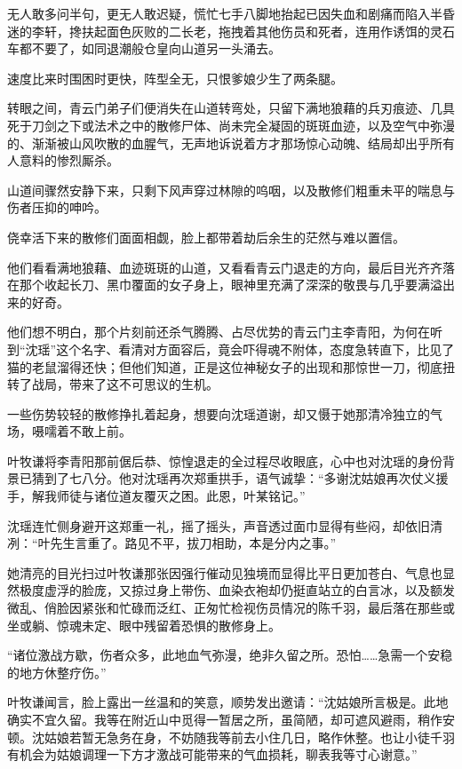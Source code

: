 无人敢多问半句，更无人敢迟疑，慌忙七手八脚地抬起已因失血和剧痛而陷入半昏迷的李轩，搀扶起面色灰败的二长老，拖拽着其他伤员和死者，连用作诱饵的灵石车都不要了，如同退潮般仓皇向山道另一头涌去。

速度比来时围困时更快，阵型全无，只恨爹娘少生了两条腿。

\vspace{2em}

转眼之间，青云门弟子们便消失在山道转弯处，只留下满地狼藉的兵刃痕迹、几具死于刀剑之下或法术之中的散修尸体、尚未完全凝固的斑斑血迹，以及空气中弥漫的、渐渐被山风吹散的血腥气，无声地诉说着方才那场惊心动魄、结局却出乎所有人意料的惨烈厮杀。

山道间骤然安静下来，只剩下风声穿过林隙的呜咽，以及散修们粗重未平的喘息与伤者压抑的呻吟。

侥幸活下来的散修们面面相觑，脸上都带着劫后余生的茫然与难以置信。

他们看看满地狼藉、血迹斑斑的山道，又看看青云门退走的方向，最后目光齐齐落在那个收起长刀、黑巾覆面的女子身上，眼神里充满了深深的敬畏与几乎要满溢出来的好奇。

他们想不明白，那个片刻前还杀气腾腾、占尽优势的青云门主李青阳，为何在听到“沈瑶”这个名字、看清对方面容后，竟会吓得魂不附体，态度急转直下，比见了猫的老鼠溜得还快；但他们知道，正是这位神秘女子的出现和那惊世一刀，彻底扭转了战局，带来了这不可思议的生机。

一些伤势较轻的散修挣扎着起身，想要向沈瑶道谢，却又慑于她那清冷独立的气场，嗫嚅着不敢上前。

叶牧谦将李青阳那前倨后恭、惊惶退走的全过程尽收眼底，心中也对沈瑶的身份背景已猜到了七八分。他对沈瑶再次郑重拱手，语气诚挚：“多谢沈姑娘再次仗义援手，解我师徒与诸位道友覆灭之困。此恩，叶某铭记。”

沈瑶连忙侧身避开这郑重一礼，摇了摇头，声音透过面巾显得有些闷，却依旧清冽：“叶先生言重了。路见不平，拔刀相助，本是分内之事。”

她清亮的目光扫过叶牧谦那张因强行催动见独境而显得比平日更加苍白、气息也显然极度虚浮的脸庞，又掠过身上带伤、血染衣袍却仍挺直站立的白言冰，以及额发微乱、俏脸因紧张和忙碌而泛红、正匆忙检视伤员情况的陈千羽，最后落在那些或坐或躺、惊魂未定、眼中残留着恐惧的散修身上。

“诸位激战方歇，伤者众多，此地血气弥漫，绝非久留之所。恐怕……急需一个安稳的地方休整疗伤。”

叶牧谦闻言，脸上露出一丝温和的笑意，顺势发出邀请：“沈姑娘所言极是。此地确实不宜久留。我等在附近山中觅得一暂居之所，虽简陋，却可遮风避雨，稍作安顿。沈姑娘若暂无急务在身，不妨随我等前去小住几日，略作休整。也让小徒千羽有机会为姑娘调理一下方才激战可能带来的气血损耗，聊表我等寸心谢意。”


